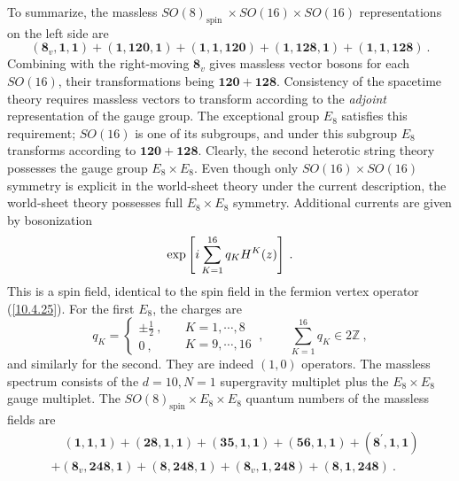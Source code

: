 To summarize, the massless $SO(8)_\text{spin }\times SO(16)\times SO(16)$ representations on the left side are
\begin{equation}
	(\mathbf{8}_{v},\mathbf{1},\mathbf{1})+(\mathbf{1},\mathbf{120},\mathbf{1})
	+(\mathbf{1},\mathbf{1},\mathbf{120})+(\mathbf{1},\mathbf{128},\mathbf{1})
	+(\mathbf{1},\mathbf{1},\mathbf{128}) \:. \label{11.2.25}
\end{equation}
Combining with the right-moving $\mathbf{8}_{v}$ gives massless vector bosons for each $SO(16)$, their transformations being $\mathbf{120}+\mathbf{128}$. Consistency of the spacetime theory requires massless vectors to transform according to the \emph{adjoint} representation of the gauge group. The exceptional group $E_{8}$ satisfies this requirement; $SO(16)$ is one of its subgroups, and under this subgroup $E_{8}$ transforms according to $\mathbf{120}+\mathbf{128}$. Clearly, the second heterotic string theory possesses the gauge group $E_{8}\times E_{8}$. Even though only $SO(16)\times SO(16)$ symmetry is explicit in the world-sheet theory under the current description, the world-sheet theory possesses full $E_{8}\times E_{8}$ symmetry. Additional currents are given by bosonization
\begin{equation}
	\exp \left[ i\sum_{K=1}^{16}q_{K}H^{K}(z) \right] \:. \label{11.2.26}
\end{equation}
This is a spin field, identical to the spin field in the fermion vertex operator (\ref{10.4.25}). For the first $E_{8}$, the charges are
\begin{equation}
	q_{K} = \left\{
	\begin{array}{l}
		\pm\tfrac{1}{2} \:,  \\
		0  \:,
	\end{array} \quad
	\begin{array}{l}
		K=1,\cdots,8  \\
		K=9,\cdots, 16 
	\end{array} \:,
	\qquad 
	\sum_{K=1}^{16} q_{K}\in 2\mathds{Z} \:, \label{11.2.27}
	\right.
\end{equation}
and similarly for the second. They are indeed $(1,0)$ operators. The massless spectrum consists of the $d=10, N=1$ supergravity multiplet plus the $E_{8}\times E_{8}$ gauge multiplet. The $SO(8)_{\text{spin}}\times E_{8}\times E_{8}$ quantum numbers of the massless fields are
\begin{align}
	&\quad (\mathbf{1},\mathbf{1},\mathbf{1})+(\mathbf{28},\mathbf{1},\mathbf{1})+(\mathbf{35},\mathbf{1},\mathbf{1})
	+(\mathbf{56},\mathbf{1},\mathbf{1})+(\mathbf{8}^{\prime},\mathbf{1},\mathbf{1})  \nonumber \\
	&+(\mathbf{8}_{v},\mathbf{248},\mathbf{1})+(\mathbf{8},\mathbf{248},\mathbf{1})
	+(\mathbf{8}_{v},\mathbf{1},\mathbf{248})+(\mathbf{8},\mathbf{1},\mathbf{248}) \:. \label{11.2.28}
\end{align}
